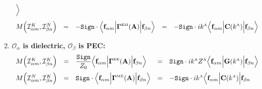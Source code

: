 \documentclass[letterpaper]{article}
\begin{document}
\begin{enumerate}
$$\begin{array}{lclcl}
{                 \Big\rangle
               }
\\[10pt]
 M\Big( \mathcal{I}^K_{\alpha m}, \mathcal{I}^N_{\beta n} \Big) 
  &=&
  \displaystyle{ -\texttt{Sign}\cdot
                 \Big\langle 
                 \mathbf{f}_{\alpha m} 
                 \Big| \boldsymbol{\Gamma}^{\hbox{\tiny{EM}}}(\mathbf{A}) \Big|
                 \mathbf{f}_{\beta n} 
                 \Big\rangle
               }
  &=&
  \displaystyle{ -\texttt{Sign}\cdot ik^{\hbox{\tiny{A}}}
                  \Big\langle 
                  \mathbf{f}_{\alpha m} 
                  \Big| \mathbf{C}(k^{\hbox{\tiny{A}}})\Big|
                  \mathbf{f}_{\beta n} 
                  \Big\rangle
               }
\end{array}$$
\item \textbf{ $\mathcal{O}_\alpha$ is dielectric, 
               $\mathcal{O}_\beta$ is PEC:}
$$\begin{array}{lclcl}
 M\Big( \mathcal{I}^K_{\alpha m}, \mathcal{I}^K_{\beta n} \Big) 
  &=& 
  \displaystyle{ \frac{\texttt{Sign}}{Z_0} 
                 \Big\langle \mathbf{f}_{\alpha m} 
                 \Big| \boldsymbol{\Gamma}^{\hbox{\tiny{EE}}}(\mathbf{A}) \Big|
                 \mathbf{f}_{\beta n} 
                 \Big\rangle
               }
  &=&
  \displaystyle{ \texttt{Sign}\cdot ik^{\hbox{\tiny{A}}} Z^{\hbox{\tiny{A}}}
                 \Big\langle \mathbf{f}_{\alpha m} 
                 \Big| \mathbf{G}(k^{\hbox{\tiny{A}}}) \Big|
                 \mathbf{f}_{\beta n} 
                 \Big\rangle
               }
\\[10pt]
 M\Big( \mathcal{I}^N_{\alpha m}, \mathcal{I}^K_{\beta n} \Big) 
  &=&
  \displaystyle{ \texttt{Sign}\cdot
                 \Big\langle 
                 \mathbf{f}_{\alpha m} 
                 \Big| \boldsymbol{\Gamma}^{\hbox{\tiny{ME}}}(\mathbf{A}) \Big|
                 \mathbf{f}_{\beta n} 
                 \Big\rangle
               }
  &=&
  \displaystyle{ -\texttt{Sign}\cdot ik^{\hbox{\tiny{A}}}
                  \Big\langle 
                  \mathbf{f}_{\alpha m} 
                  \Big| \mathbf{C}(k^{\hbox{\tiny{A}}})\Big|
                  \mathbf{f}_{\beta n} 
}
\end{array}$$
\end{enumerate}
\end{document}
